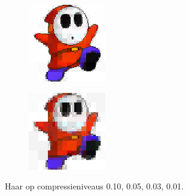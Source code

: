 \documentclass[11pt]{report}
\theoremstyle{plain}
\theoremstyle{remark}
\begin{document}
\begin{figure}
\begin{subfigure}[b]{0.24\textwidth}
	\end{subfigure}
	\begin{subfigure}[b]{0.24\textwidth}
		\centering
		\includegraphics[width=\textwidth]{plaatjes/shyguy_haar_0_03.png}
	\end{subfigure}
	\begin{subfigure}[b]{0.24\textwidth}
		\centering
		\includegraphics[width=\textwidth]{plaatjes/shyguy_haar_0_01.png}
	\end{subfigure}	
	\caption{Haar op compressieniveaus 0.10, 0.05, 0.03, 0.01.}
\end{figure}
\end{document}
